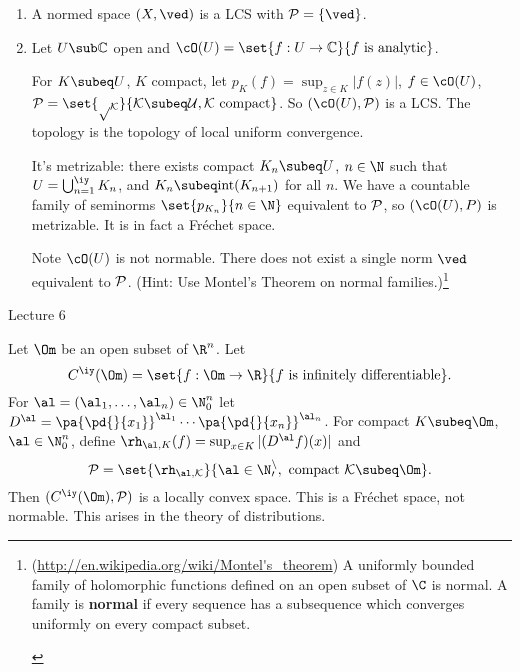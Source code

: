 \begin{ex}
\begin{enumerate}
\item
A normed space $(X,\ved)$ is a LCS with $\cal P=\{\ved\}$.
\item
Let $U \sub \mathbb{C}$ open and $\cO(U) = \set{ f :U \to \mathbb{C} }{f \text{ is analytic} }$.

For $K\subeq U$, $K$ compact, let $p_K(f)=\sup_{z\in K}|f(z)|$, $f\in \cO(U)$, $\cal P=\set{p_K}{K\subeq U,K\text{ compact}}$. So $(\cO(U),\cal P)$ is a LCS. The topology is the topology of local uniform convergence.

It's metrizable: there exists compact $K_n\subeq U$, $n\in \N$ such that $U=\bigcup_{n=1}^{\iy} K_n$, and $K_n\subeq \text{int}(K_{n+1})$ for all $n$. We have a countable family of seminorms $\set{p_{K_n}}{n\in \N}$ equivalent to $\cal P$, so $(\cO(U),P)$ is metrizable. It is in fact a Fr\'echet space. 

Note $\cO(U)$ is not normable. There does not exist a single norm $\ved$ equivalent to $\cal P$. (Hint: Use Montel's Theorem on normal families.)\footnote{\begin{thm*} (\url{http://en.wikipedia.org/wiki/Montel's_theorem})
A uniformly bounded family of holomorphic functions defined on an open subset of $\C$ is normal. A family is  \textbf{normal} if every sequence has a subsequence which converges uniformly on every compact subset. 
\end{thm*}}
\end{enumerate}
\end{ex}
{\color{blue}Lecture 6}
\begin{ex}
Let $\Om$ be an open subset of $\R^n$. Let
\[
C^{\iy}(\Om)=\set{f:\Om\to \R}{f\text{ is infinitely differentiable}}.
\]
For $\al=(\al_1,\ldots, \al_n)\in \N_0^{n}$ let $D^{\al}=\pa{\pd{}{x_1}}^{\al_1}\cdots \pa{\pd{}{x_n}}^{\al_n}$. For compact $K\subeq \Om$, $\al\in \N_0^{n}$, define $\rh_{\al,K}(f)=\sup_{x\in K}|(D^{\al}f)(x)|$ and 
\[
\cal P=\set{\rh_{\al,K}}{\al \in \N_0^n,\text{ compact }K\subeq \Om}.
\]
Then $(C^{\iy}(\Om),\cal P)$ is a locally convex space. This is a Fr\'echet space, not normable. This arises in the theory of distributions.
\end{ex}

